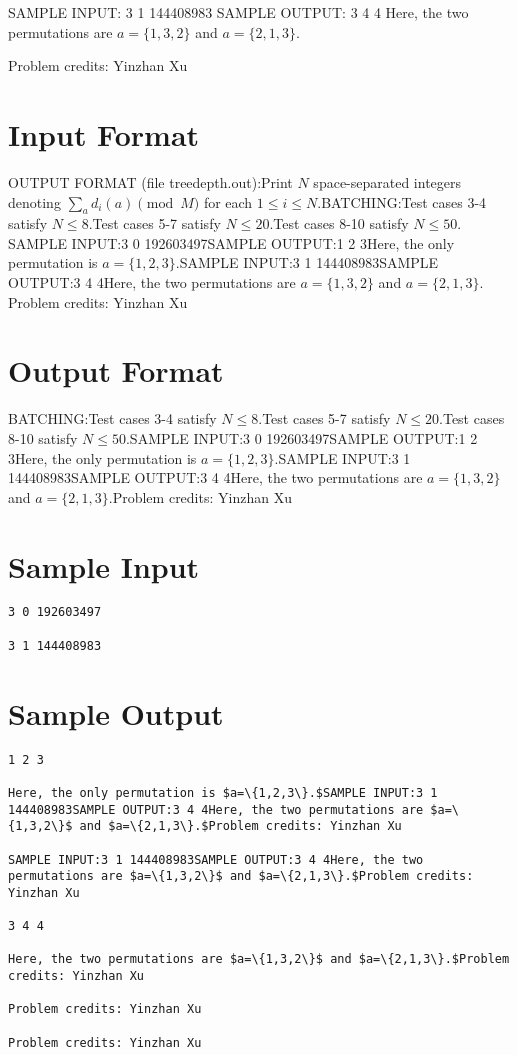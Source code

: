 \documentclass[12pt]{article}
\begin{document}
SAMPLE INPUT:
3 1 144408983
SAMPLE OUTPUT: 
3 4 4 
Here, the two permutations are $a=\{1,3,2\}$ and $a=\{2,1,3\}.$


Problem credits: Yinzhan Xu



\section*{Input Format}
OUTPUT FORMAT (file treedepth.out):Print $N$ space-separated integers denoting $\sum_ad_i(a)\pmod{M}$ for each 
$1\le i\le N.$BATCHING:Test cases 3-4 satisfy $N\le 8.$Test cases 5-7 satisfy $N\le 20.$Test cases 8-10 satisfy $N\le 50.$SAMPLE INPUT:3 0 192603497SAMPLE OUTPUT:1 2 3Here, the only permutation is $a=\{1,2,3\}.$SAMPLE INPUT:3 1 144408983SAMPLE OUTPUT:3 4 4Here, the two permutations are $a=\{1,3,2\}$ and $a=\{2,1,3\}.$Problem credits: Yinzhan Xu

\section*{Output Format}
BATCHING:Test cases 3-4 satisfy $N\le 8.$Test cases 5-7 satisfy $N\le 20.$Test cases 8-10 satisfy $N\le 50.$SAMPLE INPUT:3 0 192603497SAMPLE OUTPUT:1 2 3Here, the only permutation is $a=\{1,2,3\}.$SAMPLE INPUT:3 1 144408983SAMPLE OUTPUT:3 4 4Here, the two permutations are $a=\{1,3,2\}$ and $a=\{2,1,3\}.$Problem credits: Yinzhan Xu

\section*{Sample Input}
\begin{verbatim}
3 0 192603497

3 1 144408983
\end{verbatim}

\section*{Sample Output}
\begin{verbatim}
1 2 3

Here, the only permutation is $a=\{1,2,3\}.$SAMPLE INPUT:3 1 144408983SAMPLE OUTPUT:3 4 4Here, the two permutations are $a=\{1,3,2\}$ and $a=\{2,1,3\}.$Problem credits: Yinzhan Xu

SAMPLE INPUT:3 1 144408983SAMPLE OUTPUT:3 4 4Here, the two permutations are $a=\{1,3,2\}$ and $a=\{2,1,3\}.$Problem credits: Yinzhan Xu

3 4 4

Here, the two permutations are $a=\{1,3,2\}$ and $a=\{2,1,3\}.$Problem credits: Yinzhan Xu

Problem credits: Yinzhan Xu

Problem credits: Yinzhan Xu
\end{verbatim}
\end{document}
